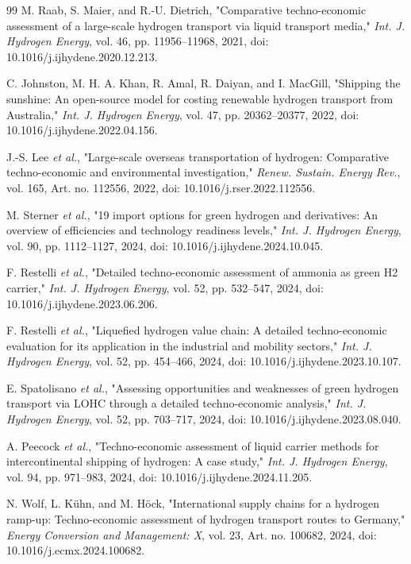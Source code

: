 \documentclass{ieeeaccess}
\begin{document}
\begin{thebibliography}{99}
M. Raab, S. Maier, and R.-U. Dietrich, "Comparative techno-economic assessment of a large-scale hydrogen transport via liquid transport media," \emph{Int. J. Hydrogen Energy}, vol. 46, pp. 11956--11968, 2021, doi: 10.1016/j.ijhydene.2020.12.213.

C. Johnston, M. H. A. Khan, R. Amal, R. Daiyan, and I. MacGill, "Shipping the sunshine: An open-source model for costing renewable hydrogen transport from Australia," \emph{Int. J. Hydrogen Energy}, vol. 47, pp. 20362--20377, 2022, doi: 10.1016/j.ijhydene.2022.04.156.

J.-S. Lee \emph{et al.}, "Large-scale overseas transportation of hydrogen: Comparative techno-economic and environmental investigation," \emph{Renew. Sustain. Energy Rev.}, vol. 165, Art. no. 112556, 2022, doi: 10.1016/j.rser.2022.112556.

M. Sterner \emph{et al.}, "19 import options for green hydrogen and derivatives: An overview of efficiencies and technology readiness levels," \emph{Int. J. Hydrogen Energy}, vol. 90, pp. 1112--1127, 2024, doi: 10.1016/j.ijhydene.2024.10.045.

F. Restelli \emph{et al.}, "Detailed techno-economic assessment of ammonia as green H2 carrier," \emph{Int. J. Hydrogen Energy}, vol. 52, pp. 532--547, 2024, doi: 10.1016/j.ijhydene.2023.06.206.

F. Restelli \emph{et al.}, "Liquefied hydrogen value chain: A detailed techno-economic evaluation for its application in the industrial and mobility sectors," \emph{Int. J. Hydrogen Energy}, vol. 52, pp. 454--466, 2024, doi: 10.1016/j.ijhydene.2023.10.107.

E. Spatolisano \emph{et al.}, "Assessing opportunities and weaknesses of green hydrogen transport via LOHC through a detailed techno-economic analysis," \emph{Int. J. Hydrogen Energy}, vol. 52, pp. 703--717, 2024, doi: 10.1016/j.ijhydene.2023.08.040.

A. Peecock \emph{et al.}, "Techno-economic assessment of liquid carrier methods for intercontinental shipping of hydrogen: A case study," \emph{Int. J. Hydrogen Energy}, vol. 94, pp. 971--983, 2024, doi: 10.1016/j.ijhydene.2024.11.205.

N. Wolf, L. K\"uhn, and M. H\"ock, "International supply chains for a hydrogen ramp-up: Techno-economic assessment of hydrogen transport routes to Germany," \emph{Energy Conversion and Management: X}, vol. 23, Art. no. 100682, 2024, doi: 10.1016/j.ecmx.2024.100682.


\end{thebibliography}
\end{document}
